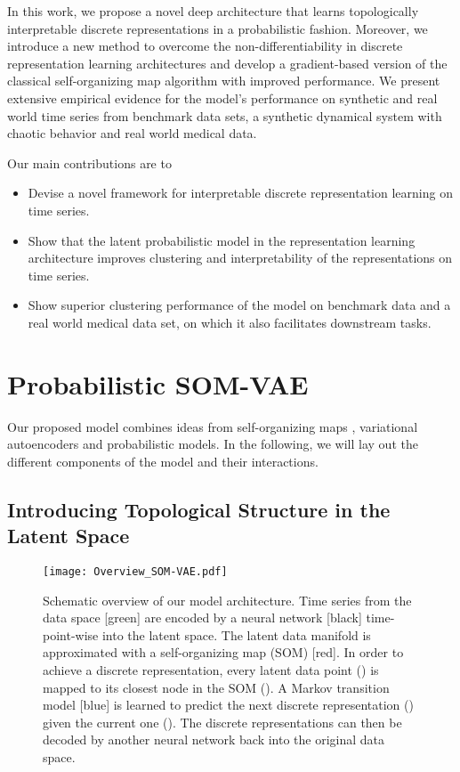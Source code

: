\documentclass{article}
\begin{document}
In this work, we propose a novel deep architecture that learns topologically interpretable discrete representations in a probabilistic fashion.
Moreover, we introduce a new method to overcome the non-differentiability in discrete representation learning architectures and develop a gradient-based version of the classical self-organizing map algorithm with improved performance.
We present extensive empirical evidence for the model's performance on synthetic and real world time series from benchmark data sets, a synthetic dynamical system with chaotic behavior and real world medical data.

Our main contributions are to

\begin{itemize}
	\item Devise a novel framework for interpretable discrete representation learning on time series.
	\item Show that the latent probabilistic model in the representation learning architecture improves clustering and interpretability of the representations on time series.
	\item Show superior clustering performance of the model on benchmark data and a real world medical data set, on which it also facilitates downstream tasks.
\end{itemize} 
\FloatBarrier

\section{Probabilistic SOM-VAE}

Our proposed model combines ideas from self-organizing maps \citep{Kohonen1998}, variational autoencoders \citep{Kingma2013} and probabilistic models.
In the following, we will lay out the different components of the model and their interactions.


\subsection{Introducing Topological Structure in the Latent Space} \label{sec:SOM-VAE}

\begin{figure}
    \centering
    \texttt{[image: Overview\_SOM-VAE.pdf]}
    \caption{Schematic overview of our model architecture. Time series from the data space [green] are encoded by a neural network [black] time-point-wise into the latent space. The latent data manifold is approximated with a self-organizing map (SOM) [red]. In order to achieve a discrete representation, every latent data point () is mapped to its closest node in the SOM (). A Markov transition model [blue] is learned to predict the next discrete representation () given the current one (). The discrete representations can then be decoded by another neural network back into the original data space.}
    \label{fig:overview}
\end{figure}
\end{document}
